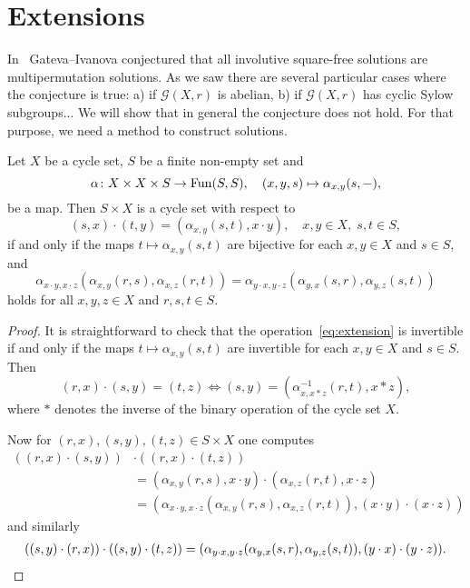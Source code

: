 \chapter{Extensions}

In~\cite{MR2095675} Gateva--Ivanova conjectured that all involutive square-free solutions 
are multipermutation solutions. 
As we saw there are several particular cases where the conjecture is true: 
a) if $\mathcal{G}(X,r)$ is abelian, 
b) if $\mathcal{G}(X,r)$ has cyclic Sylow subgroups...
We will show that in general the conjecture does not hold. 
For that purpose, we need a method to construct 
solutions. 

\begin{proposition}
	\label{pro:dynamical}
	Let $X$ be a cycle set, $S$ be a finite non-empty set and
	\[
	\alpha\colon X\times X\times S\to\operatorname{Fun}(S,S),
	\quad
	(x,y,s)\mapsto\alpha_{x,y}(s,-),
	\]
	be a map.  Then $S\times X$ is a cycle set
	with respect to 
	\begin{equation}
		\label{eq:extension}
		(s,x)\cdot (t,y)=(\alpha_{x,y}(s,t),x\cdot y),\quad
   	x,y\in X,\;s,t\in S, 
	\end{equation}
	if and only if the maps $t\mapsto \alpha_{x,y}(s,t)$ are bijective for each 
	$x,y\in X$ and $s\in S$, and 
	\begin{equation}
		\label{eq:dynamical}
		\alpha_{x\cdot y,x\cdot z}(\alpha_{x,y}(r,s),\alpha_{x,z}(r,t))
		=\alpha_{y\cdot x,y\cdot z}(\alpha_{y,x}(s,r),\alpha_{y,z}(s,t))
	\end{equation}
	holds for all $x,y,z\in X$ and $r,s,t\in S$. 
\end{proposition}

\begin{proof}
	It is straightforward to check that the operation~\eqref{eq:extension} is
	invertible if and only if the maps $t\mapsto\alpha_{x,y}(s,t)$ are invertible
	for each $x,y\in X$ and $s\in S$.  Then 
	\[
	(r,x)\cdot (s,y)=(t,z)\iff
	(s,y)=(\alpha^{-1}_{x,x*z}(r,t),x*z),
	\]
	where $*$ denotes the inverse of the binary operation of the cycle set $X$. 

	Now for $(r,x),(s,y),(t,z)\in S\times X$ one computes
	\begin{align*}
		((r,x)\cdot (s,y))&\cdot ((r,x)\cdot (t,z))\\
		&= (\alpha_{x,y}(r,s),x\cdot y)\cdot (\alpha_{x,z}(r,t),x\cdot z)\\
		&=(\alpha_{x\cdot y,x\cdot z}(\alpha_{x,y}(r,s),\alpha_{x,z}(r,t)),(x\cdot y)\cdot (x\cdot z))
	\end{align*}
	and similarly
	\begin{multline*}
		((s,y)\cdot (r,x))\cdot ((s,y)\cdot (t,z))
		=(\alpha_{y\cdot x,y\cdot z}(\alpha_{y,x}(s,r),\alpha_{y,z}(s,t)),(y\cdot x)\cdot (y\cdot z)).\qedhere
	\end{multline*}
\end{proof}

